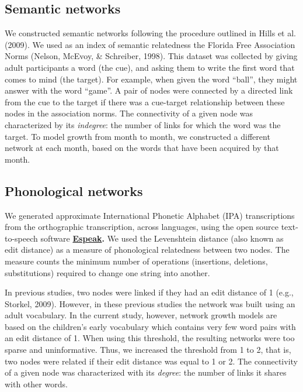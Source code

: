\documentclass[10pt, letterpaper]{article}
\begin{document}
\subsection{Semantic networks}\label{semantic-networks}

We constructed semantic networks following the procedure outlined in
Hills et al. (2009). We used as an index of semantic relatedness the
Florida Free Association Norms (Nelson, McEvoy, \& Schreiber, 1998).
This dataset was collected by giving adult participants a word (the
cue), and asking them to write the first word that comes to mind (the
target). For example, when given the word ``ball'', they might answer
with the word ``game''. A pair of nodes were connected by a directed
link from the cue to the target if there was a cue-target relationship
between these nodes in the association norms. The connectivity of a
given node was characterized by its \emph{indegree}: the number of links
for which the word was the target. To model growth from month to month,
we constructed a different network at each month, based on the words
that have been acquired by that month.

\subsection{Phonological networks}\label{phonological-networks}

We generated approximate International Phonetic Alphabet (IPA)
transcriptions from the orthographic transcription, across languages,
using the open source text-to-speech software
\textbf{\href{http://http://espeak.sourceforge.net/}{Espeak}.} We used
the Levenshtein distance (also known as edit distance) as a measure of
phonological relatedness between two nodes. The measure counts the
minimum number of operations (insertions, deletions, substitutions)
required to change one string into another.

In previous studies, two nodes were linked if they had an edit distance
of 1 (e.g., Storkel, 2009). However, in these previous studies the
network was built using an adult vocabulary. In the current study,
however, network growth models are based on the children's early
vocabulary which contains very few word pairs with an edit distance of
1. When using this threshold, the resulting networks were too sparse and
uninformative. Thus, we increased the threshold from 1 to 2, that is,
two nodes were related if their edit distance was equal to 1 or 2. The
connectivity of a given node was characterized with its \emph{degree}:
the number of links it shares with other words.
\end{document}
